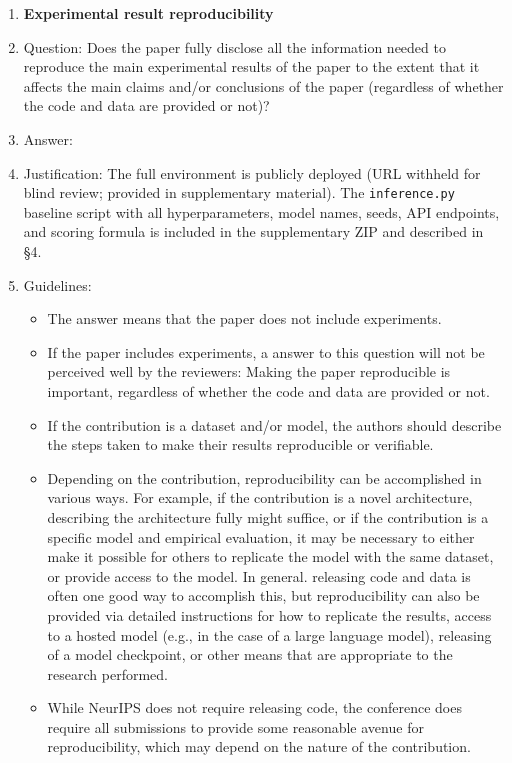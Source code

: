 \begin{enumerate}
    \item {\bf Experimental result reproducibility}
    \item[] Question: Does the paper fully disclose all the information needed to reproduce the main experimental results of the paper to the extent that it affects the main claims and/or conclusions of the paper (regardless of whether the code and data are provided or not)?
    \item[] Answer: \answerYes{}
    \item[] Justification: The full environment is publicly deployed (URL withheld for blind review; provided in supplementary material). The \texttt{inference.py} baseline script with all hyperparameters, model names, seeds, API endpoints, and scoring formula is included in the supplementary ZIP and described in \S4.
    \item[] Guidelines: \begin{itemize}
        \item The answer \answerNA{} means that the paper does not include experiments.
        \item If the paper includes experiments, a \answerNo{} answer to this question will not be perceived well by the reviewers: Making the paper reproducible is important, regardless of whether the code and data are provided or not.
        \item If the contribution is a dataset and/or model, the authors should describe the steps taken to make their results reproducible or verifiable.
        \item Depending on the contribution, reproducibility can be accomplished in various ways. For example, if the contribution is a novel architecture, describing the architecture fully might suffice, or if the contribution is a specific model and empirical evaluation, it may be necessary to either make it possible for others to replicate the model with the same dataset, or provide access to the model. In general. releasing code and data is often one good way to accomplish this, but reproducibility can also be provided via detailed instructions for how to replicate the results, access to a hosted model (e.g., in the case of a large language model), releasing of a model checkpoint, or other means that are appropriate to the research performed.
        \item While NeurIPS does not require releasing code, the conference does require all submissions to provide some reasonable avenue for reproducibility, which may depend on the nature of the contribution.
    \end{itemize}



\end{enumerate}
